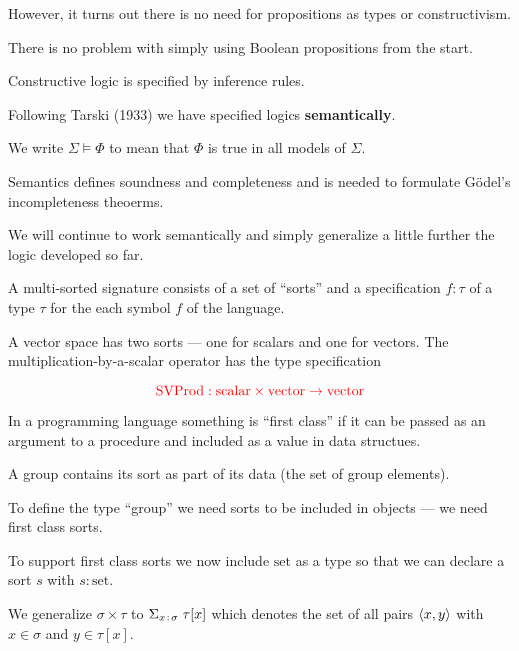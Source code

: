{\vfill
However, it turns out there is no need for propositions as types or constructivism.

\vfill
There is no problem with simply using Boolean propositions from the start.


Constructive logic is specified by inference rules.

\vfill
Following Tarski (1933) we have specified logics {\bf semantically}.

\vfill
We write $\Sigma \models \Phi$ to mean that $\Phi$ is true in all models of $\Sigma$.

\vfill Semantics defines soundness and completeness and is needed to formulate G\"{o}del's incompleteness theoerms.

\vfill
We will continue to work semantically and simply generalize a little further the logic developed so far.



{\huge
A multi-sorted signature consists of a set of ``sorts'' and a specification $f\!:\!\tau$ of a type $\tau$ for the each symbol $f$ of the language.

\vfill
A vector space has two sorts --- one for scalars and one for vectors.
The multiplication-by-a-scalar operator has the type specification

$${\color{red}\mathrm{SVProd}: \mathrm{scalar} \times \mathrm{vector} \rightarrow \mathrm{vector}}$$
}


In a programming language something is ``first class'' if it can be passed as an argument to a procedure and included as a value in data structues.

\vfill
A group contains its sort as part of its data (the set of group elements).

\vfill
To define the type ``group'' we need sorts to be included in objects --- we need first class sorts.


\vfill
To support first class sorts we now include {\color{red} $\mathrm{set}$} as a type so that we can declare a sort $s$ with
{\color{red}$s:\mathrm{set}$}.

\vfill
We generalize {\color{red} $\sigma \times \tau$} to {\color{red} $\Sigma_{x\;\!:\!\;\sigma}\;\tau[x]$} which denotes the set of all pairs ${\mbox{$\langle x,y\rangle$}}$ with $x \in \sigma$ and $y \in \tau[x]$.

}
